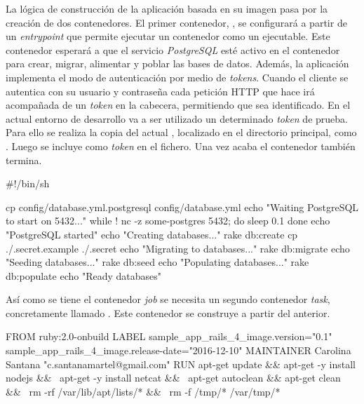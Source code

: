 La lógica de construcción de la aplicación basada en su imagen pasa por la creación de dos contenedores. El primer contenedor, , se configurará a partir de un \textit{entrypoint} que permite ejecutar un contenedor como un ejecutable. Este contenedor esperará a que el servicio \textit{PostgreSQL} esté activo en el contenedor  para crear, migrar, alimentar y poblar las bases de datos. Además, la aplicación implementa el modo de autenticación por medio de \textit{tokens}. Cuando el cliente se autentica con su usuario y contraseña cada petición HTTP que hace irá acompañada de un \textit{token} en la cabecera, permitiendo que sea identificado. En el actual entorno de desarrollo va a ser utilizado un determinado \textit{token} de prueba. Para ello se realiza la copia del actual , localizado en el directorio principal, como . Luego se incluye como \textit{token} en el fichero. Una vez acaba el contenedor también termina. 

\begin{codelisting}
\label{code:dockerfile}
\begin{code}
#!/bin/sh

cp config/database.yml.postgresql config/database.yml
echo "Waiting PostgreSQL to start on 5432..."
while ! nc -z some-postgres 5432; do
  sleep 0.1
done
echo "PostgreSQL started"
echo "Creating databases..."
rake db:create
cp ./.secret.example ./.secret
echo "Migrating to databases..."
rake db:migrate
echo "Seeding databases..."
rake db:seed
echo "Populating databases..."
rake db:populate
echo "Ready databases"
\end{code}
\end{codelisting}

Así como se tiene el contenedor \textit{job} se necesita un segundo contenedor \textit{task}, concretamente llamado . Este contenedor se construye a partir del anterior.

\begin{codelisting}
\label{code:dockerfile}
\begin{code}
FROM ruby:2.0-onbuild
LABEL sample_app_rails_4_image.version="0.1" 
      sample_app_rails_4_image.release-date="2016-12-10"
MAINTAINER Carolina Santana "c.santanamartel@gmail.com"
RUN apt-get update && apt-get -y install nodejs && \
    apt-get -y install netcat && \
    apt-get autoclean && apt-get clean && \
    rm -rf /var/lib/apt/lists/* && \
    rm -f /tmp/* /var/tmp/*
\end{code}
\end{codelisting}

